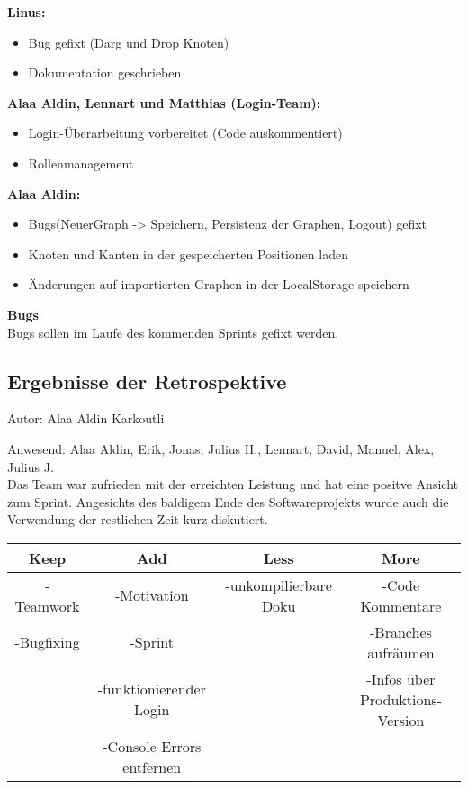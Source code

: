 \textbf{Linus:}
\begin{itemize}
\item Bug gefixt (Darg und Drop Knoten)
\item Dokumentation geschrieben
\end{itemize}

\textbf{Alaa Aldin, Lennart und Matthias (Login-Team):}
\begin{itemize}
\item Login-Überarbeitung vorbereitet (Code auskommentiert)
\item Rollenmanagement 
\end{itemize}

\textbf{Alaa Aldin:}
\begin{itemize}
\item Bugs(NeuerGraph -> Speichern, Persistenz der Graphen, Logout) gefixt
\item Knoten und Kanten in der gespeicherten Positionen laden
\item Änderungen auf importierten Graphen in der LocalStorage speichern
\end{itemize}

\textbf{Bugs}\\
Bugs sollen im Laufe des kommenden Sprints gefixt werden.\\

\subsection{Ergebnisse der Retrospektive}
{\small Autor: Alaa Aldin Karkoutli}

Anwesend: Alaa Aldin, Erik, Jonas, Julius H., Lennart, David, Manuel, Alex, Julius J. \\

Das Team war zufrieden mit der erreichten Leistung und hat eine positve Ansicht zum Sprint. Angesichts des baldigem Ende des Softwareprojekts wurde auch die Verwendung der restlichen Zeit kurz diskutiert.\\

\begin{center}
\begin{tabular}{ |c|c|c|c| }
\hline
 Keep & Add & Less & More\\
\hline 
-Teamwork & -Motivation & -unkompilierbare Doku & -Code Kommentare \\
-Bugfixing & -Sprint & & -Branches aufräumen \\
 & -funktionierender Login & & -Infos über Produktions-Version \\
 & -Console Errors entfernen & & \\
\hline     
\end{tabular}
\end{center}

